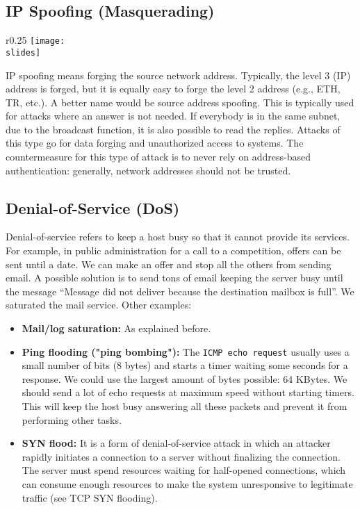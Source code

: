 \subsection{IP Spoofing (Masquerading)}
\begin{wrapfigure}{r}{0.25\textwidth}
  \centering
  \texttt{[image: \\slides]}
\end{wrapfigure}
IP spoofing means forging the source network address. Typically, the level 3 (IP) address is forged, but it is equally easy to forge the level 2 address (e.g., ETH, TR, etc.). A better name would be source address spoofing. This is typically used for attacks where an answer is not needed. If everybody is in the same subnet, due to the broadcast function, it is also possible to read the replies. Attacks of this type go for data forging and unauthorized access to systems. The countermeasure for this type of attack is to never rely on address-based authentication: generally, network addresses should not be trusted.

\subsection{Denial-of-Service (DoS)}
Denial-of-service refers to keep a host busy so that it cannot provide its services. For example, in public
administration for a call to a competition, offers can be sent until a date. We can make an offer and stop all the
others from sending email. A possible solution is to send tons of email keeping the server busy until the
message “Message did not deliver because the destination mailbox is full”. We saturated the mail service.
Other examples:
\begin{itemize}
  \item \textbf{Mail/log saturation:} As explained before.
  \item \textbf{Ping flooding ("ping bombing"):} The \texttt{ICMP echo request} usually uses a small number of bits (8 bytes) and starts a timer waiting some seconds for a response. We could use the largest amount of bytes possible: 64 KBytes. We should send a lot of echo requests at maximum speed without starting timers. This will keep the host busy answering all these packets and prevent it from performing other tasks.
  \item \textbf{SYN flood:} It is a form of denial-of-service attack in which an attacker rapidly initiates a connection to a server without finalizing the connection. The server must spend resources waiting for half-opened connections, which can consume enough resources to make the system unresponsive to legitimate traffic (see TCP SYN flooding).
\end{itemize}

